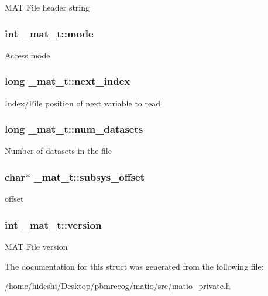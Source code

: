 \-M\-A\-T \-File header string \hypertarget{struct__mat__t_aa43288b63b8edb7cadf0b79e2d1df2ee}{
\subsubsection[{mode}]{\setlength{\rightskip}{0pt plus 5cm}int {\bf \-\_\-mat\-\_\-t\-::mode}}}\label{struct__mat__t_aa43288b63b8edb7cadf0b79e2d1df2ee}
\-Access mode \hypertarget{struct__mat__t_ab673fe0b330cf4666a66924e37d908d8}{
\subsubsection[{next\-\_\-index}]{\setlength{\rightskip}{0pt plus 5cm}long {\bf \-\_\-mat\-\_\-t\-::next\-\_\-index}}}\label{struct__mat__t_ab673fe0b330cf4666a66924e37d908d8}
\-Index/\-File position of next variable to read \hypertarget{struct__mat__t_afa714cbc14c9846e8e62df7cae0a9181}{
\subsubsection[{num\-\_\-datasets}]{\setlength{\rightskip}{0pt plus 5cm}long {\bf \-\_\-mat\-\_\-t\-::num\-\_\-datasets}}}\label{struct__mat__t_afa714cbc14c9846e8e62df7cae0a9181}
\-Number of datasets in the file \hypertarget{struct__mat__t_a19317c01209959d755d69311960d3eec}{
\subsubsection[{subsys\-\_\-offset}]{\setlength{\rightskip}{0pt plus 5cm}char$\ast$ {\bf \-\_\-mat\-\_\-t\-::subsys\-\_\-offset}}}\label{struct__mat__t_a19317c01209959d755d69311960d3eec}
offset \hypertarget{struct__mat__t_a729c2bc0afc97485057a5af425635b1a}{
\subsubsection[{version}]{\setlength{\rightskip}{0pt plus 5cm}int {\bf \-\_\-mat\-\_\-t\-::version}}}\label{struct__mat__t_a729c2bc0afc97485057a5af425635b1a}
\-M\-A\-T \-File version 

\-The documentation for this struct was generated from the following file\-:\begin{DoxyCompactItemize}
\item 
/home/hideshi/\-Desktop/pbmrecog/matio/src/matio\-\_\-private.\-h\end{DoxyCompactItemize}
